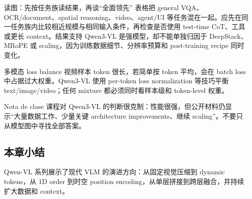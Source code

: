 \begin{knowledgebox}{读图：先按任务族读结果，再谈“全面领先”}
表格把 general VQA、OCR/document、spatial reasoning、video、agent/UI 等任务混在一起。应先在同一任务族内比较相近规模与相同输入条件，再检查是否使用 test-time CoT、工具或更长 context。结果支持 Qwen3-VL 是强模型，却不能单独归因于 DeepStack、MRoPE 或 scaling，因为训练数据细节、分辨率预算和 post-training recipe 同时变化。
\end{knowledgebox}

\begin{warningbox}{多模态 loss balance}
视频样本 token 很长，若简单按 token 平均，会在 batch loss 中占据过大权重。Qwen3-VL 使用 per-token loss normalization 等技巧平衡 text/image/video；任何 mixture 都必须同时看样本级和 token-level 权重。
\end{warningbox}

\begin{knowledgebox}{Nota de clase}
课程对 Qwen3-VL 的判断很克制：性能很强，但公开材料仍显示“大量数据工作、少量关键 architecture improvements、继续 scaling”。不要只从模型图中寻找全部答案。
\end{knowledgebox}

\subsection{本章小结}

Qwen-VL 系列展示了现代 VLM 的演进方向：从固定视觉压缩到 dynamic tokens，从 1D order 到时空 position encoding，从单层拼接到跨层融合，并持续扩大数据和 context。

